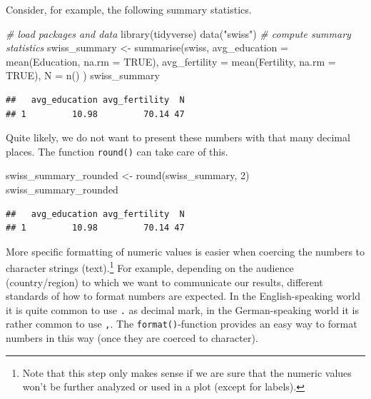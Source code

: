 \documentclass[
  12pt,
]{style/krantz}
\newenvironment{Shaded}{\begin{snugshade}}{\end{snugshade}}
\newcommand{\AttributeTok}[1]{\textcolor[rgb]{0.77,0.63,0.00}{#1}}
\newcommand{\CommentTok}[1]{\textcolor[rgb]{0.56,0.35,0.01}{\textit{#1}}}
\newcommand{\ConstantTok}[1]{\textcolor[rgb]{0.00,0.00,0.00}{#1}}
\newcommand{\DecValTok}[1]{\textcolor[rgb]{0.00,0.00,0.81}{#1}}
\newcommand{\FunctionTok}[1]{\textcolor[rgb]{0.00,0.00,0.00}{#1}}
\newcommand{\NormalTok}[1]{#1}
\newcommand{\OtherTok}[1]{\textcolor[rgb]{0.56,0.35,0.01}{#1}}
\newcommand{\StringTok}[1]{\textcolor[rgb]{0.31,0.60,0.02}{#1}}
\begin{document}
Consider, for example, the following summary statistics.

\begin{Shaded}
\begin{Highlighting}[]
\CommentTok{\# load packages and data}
\FunctionTok{library}\NormalTok{(tidyverse)}
\FunctionTok{data}\NormalTok{(}\StringTok{"swiss"}\NormalTok{)}
\CommentTok{\# compute summary statistics}
\NormalTok{swiss\_summary }\OtherTok{\textless{}{-}}
  \FunctionTok{summarise}\NormalTok{(swiss, }
          \AttributeTok{avg\_education =} \FunctionTok{mean}\NormalTok{(Education, }\AttributeTok{na.rm =} \ConstantTok{TRUE}\NormalTok{),}
          \AttributeTok{avg\_fertility =} \FunctionTok{mean}\NormalTok{(Fertility, }\AttributeTok{na.rm =} \ConstantTok{TRUE}\NormalTok{),}
          \AttributeTok{N =} \FunctionTok{n}\NormalTok{()}
\NormalTok{          )}
\NormalTok{swiss\_summary}
\end{Highlighting}
\end{Shaded}

\begin{verbatim}
##   avg_education avg_fertility  N
## 1         10.98         70.14 47
\end{verbatim}

Quite likely, we do not want to present these numbers with that many decimal places. The function \texttt{round()} can take care of this.

\begin{Shaded}
\begin{Highlighting}[]
\NormalTok{swiss\_summary\_rounded }\OtherTok{\textless{}{-}} \FunctionTok{round}\NormalTok{(swiss\_summary, }\DecValTok{2}\NormalTok{)}
\NormalTok{swiss\_summary\_rounded}
\end{Highlighting}
\end{Shaded}

\begin{verbatim}
##   avg_education avg_fertility  N
## 1         10.98         70.14 47
\end{verbatim}

More specific formatting of numeric values is easier when coercing the numbers to character strings (text).\footnote{Note that this step only makes sense if we are sure that the numeric values won't be further analyzed or used in a plot (except for labels).} For example, depending on the audience (country/region) to which we want to communicate our results, different standards of how to format numbers are expected. In the English-speaking world it is quite common to use \texttt{.} as decimal mark, in the German-speaking world it is rather common to use \texttt{,}. The \texttt{format()}-function provides an easy way to format numbers in this way (once they are coerced to character).
\end{document}
